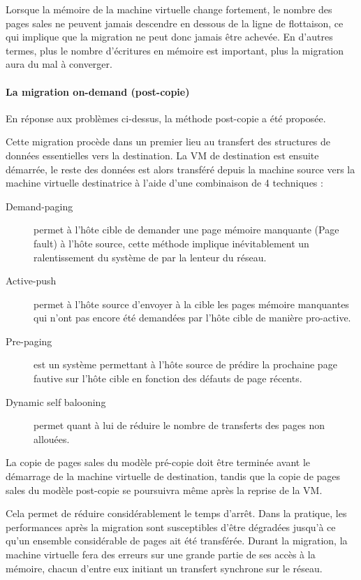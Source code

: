 Lorsque la mémoire de la machine virtuelle change fortement, le nombre des pages sales ne peuvent jamais descendre en dessous de la ligne de flottaison, ce qui implique que la migration ne peut donc jamais être achevée.
En d'autres termes, plus le nombre d'écritures en mémoire est important, plus la migration aura du mal à converger. 

\paragraph*{La migration on-demand (post-copie)}
En réponse aux problèmes ci-dessus, la méthode post-copie a été proposée.

Cette migration procède dans un premier lieu au transfert des structures de données essentielles vers la destination.
La VM de destination est ensuite démarrée, le reste des données est alors transféré depuis la machine source vers la machine virtuelle destinatrice à l'aide d'une combinaison de 4 techniques :
\begin{description}
    \item[Demand-paging] permet à l'hôte cible de demander une page mémoire manquante (Page fault) à l'hôte source, cette méthode implique inévitablement un ralentissement du système de par la lenteur du réseau.
    \item[Active-push] permet à l'hôte source d'envoyer à la cible les pages mémoire manquantes qui n'ont pas encore été demandées par l'hôte cible de manière pro-active.
    \item[Pre-paging] est un système permettant à l'hôte source de prédire la prochaine page fautive sur l'hôte cible en fonction des défauts de page récents.
    \item[Dynamic self balooning] permet quant à lui de réduire le nombre de transferts des pages non allouées.
\end{description}

La copie de pages sales du modèle pré-copie doit être terminée avant le démarrage de la machine virtuelle de destination, tandis que la copie de pages sales du modèle post-copie se poursuivra même après la reprise de la VM.

Cela permet de réduire considérablement le temps d'arrêt.
Dans la pratique, les performances après la migration sont susceptibles d'être dégradées jusqu'à ce qu'un ensemble considérable de pages ait été transférée.
Durant la migration, la machine virtuelle fera des erreurs sur une grande partie de ses accès à la mémoire, chacun d'entre eux initiant un transfert synchrone sur le réseau.

